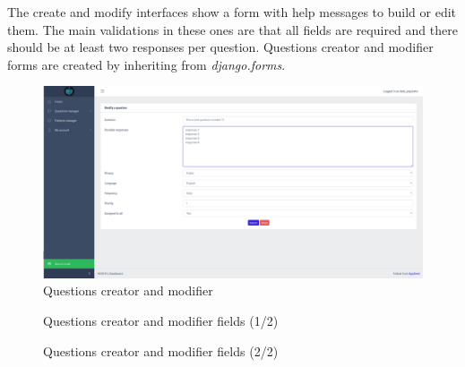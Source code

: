 \documentclass[12pt,english]{article}
\begin{document}
The create and modify interfaces show a form with help messages to build or edit them. The main validations in these ones are that all fields are required and there should be at least two responses per question. Questions creator and modifier forms are created by inheriting from \emph{django.forms}.

\begin{figure}[H]
  \centering
    \includegraphics[width=\textwidth]{questions_modifier.png}
  \caption{Questions creator and modifier}
\end{figure}

\begin{figure}[H]
    \caption{Questions creator and modifier fields (1/2)}
\end{figure}

\begin{figure}[H]
    \caption{Questions creator and modifier fields (2/2)}
\end{figure}
\end{document}
